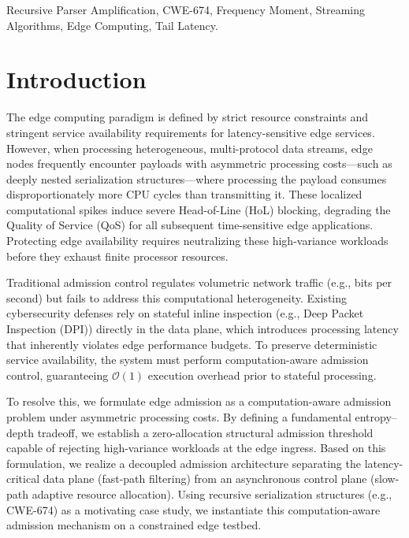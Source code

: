 \documentclass[conference]{IEEEtran}
\begin{document}
\begin{IEEEkeywords}
Recursive Parser Amplification, CWE-674, Frequency Moment, Streaming Algorithms, Edge Computing, Tail Latency.
\end{IEEEkeywords}

\section{Introduction}
The edge computing paradigm is defined by strict resource constraints and stringent service availability requirements for latency-sensitive edge services. However, when processing heterogeneous, multi-protocol data streams, edge nodes frequently encounter payloads with asymmetric processing costs—such as deeply nested serialization structures—where processing the payload consumes disproportionately more CPU cycles than transmitting it. These localized computational spikes induce severe Head-of-Line (HoL) blocking, degrading the Quality of Service (QoS) for all subsequent time-sensitive edge applications. Protecting edge availability requires neutralizing these high-variance workloads before they exhaust finite processor resources.

Traditional admission control regulates volumetric network traffic (e.g., bits per second) but fails to address this computational heterogeneity. Existing cybersecurity defenses rely on stateful inline inspection (e.g., Deep Packet Inspection (DPI)) directly in the data plane, which introduces processing latency that inherently violates edge performance budgets. To preserve deterministic service availability, the system must perform computation-aware admission control, guaranteeing $\mathcal{O}(1)$ execution overhead prior to stateful processing.

To resolve this, we formulate edge admission as a computation-aware admission problem under asymmetric processing costs. By defining a fundamental entropy--depth tradeoff, we establish a zero-allocation structural admission threshold capable of rejecting high-variance workloads at the edge ingress. Based on this formulation, we realize a decoupled admission architecture separating the latency-critical data plane (fast-path filtering) from an asynchronous control plane (slow-path adaptive resource allocation). Using recursive serialization structures (e.g., CWE-674) as a motivating case study, we instantiate this computation-aware admission mechanism on a constrained edge testbed.
\end{document}

